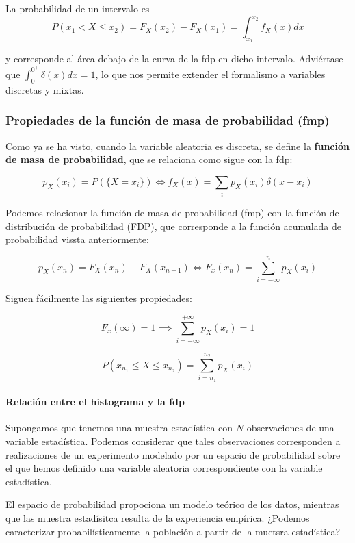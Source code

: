 \documentclass[11pt]{article}
\begin{document}
La probabilidad de un intervalo es
\[P(x_1< X \leq x_2) = F_X(x_2)-F_X(x_1)=\int_{x_1}^{x_2}f_X(x)dx\]

y corresponde al área debajo de la curva de la fdp en dicho intervalo.
Adviértase que \(\int_{0^-}^{0^+}\delta(x)dx = 1\), lo que nos permite
extender el formalismo a variables discretas y mixtas.

    \hypertarget{propiedades-de-la-funciuxf3n-de-masa-de-probabilidad-fmp}{%
\subsubsection*{Propiedades de la función de masa de probabilidad
(fmp)}\label{propiedades-de-la-funciuxf3n-de-masa-de-probabilidad-fmp}}

Como ya se ha visto, cuando la variable aleatoria es discreta, se define
la \textbf{función de masa de probabilidad}, que se relaciona como sigue
con la fdp:

\[p_X(x_i)=P(\{X=x_i\})\iff f_X(x)=\sum_{i}p_X(x_i)\delta(x-x_i)\]

Podemos relacionar la función de masa de probabilidad (fmp) con la
función de distribución de probabilidad (FDP), que corresponde a la
función acumulada de probabilidad vissta anteriormente:

\[p_X(x_n) = F_X(x_n)-F_X(x_{n-1}) \iff F_x(x_n)=\sum_{i=-\infty}^n p_X(x_i)\]

Siguen fácilmente las siguientes propiedades:

\[F_x(\infty)=1 \implies \sum_{i=-\infty}^{+\infty} p_X(x_i)=1\]

\[P(x_{n_1} \leq X \leq x_{n_2}) = \sum_{i=n_1}^{n_2} p_X(x_i)\]

    \hypertarget{relaciuxf3n-entre-el-histograma-y-la-fdp}{%
\paragraph{Relación entre el histograma y la
fdp}\label{relaciuxf3n-entre-el-histograma-y-la-fdp}}

Supongamos que tenemos una muestra estadística con \(N\) observaciones
de una variable estadística. Podemos considerar que tales observaciones
corresponden a realizaciones de un experimento modelado por un espacio
de probabilidad sobre el que hemos definido una variable aleatoria
correspondiente con la variable estadística.

El espacio de probabilidad propociona un modelo teórico de los datos,
mientras que las muestra estadísitca resulta de la experiencia empírica.
¿Podemos caracterizar probabilísticamente la población a partir de la
muetsra estadística?
\end{document}
